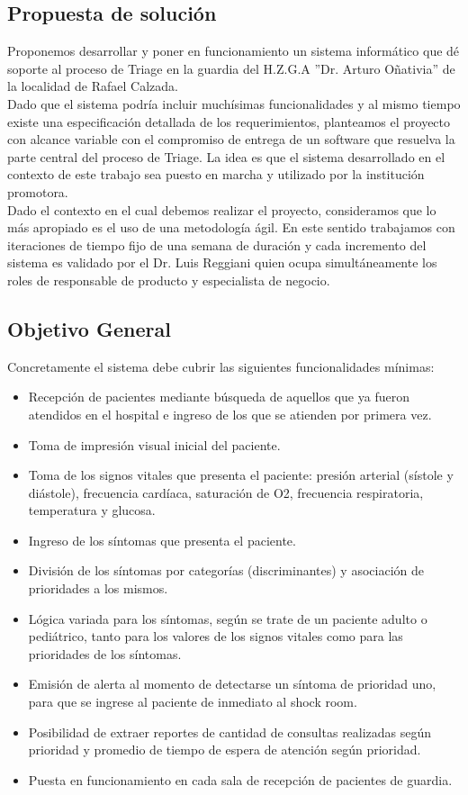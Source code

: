 \subsection{Propuesta de solución}
Proponemos desarrollar y poner en funcionamiento un sistema informático que dé soporte al proceso de Triage en la guardia del H.Z.G.A ''Dr. Arturo Oñativia'' de la localidad de Rafael Calzada.\\
Dado que el sistema podría incluir muchísimas funcionalidades y al mismo tiempo existe una especificación detallada de los requerimientos, planteamos el proyecto con alcance variable con el compromiso de entrega de un software que resuelva la parte central del proceso de Triage. La idea es que el sistema desarrollado en el contexto de este trabajo sea puesto en marcha y utilizado por la institución promotora.\\
Dado el contexto en el cual debemos realizar el proyecto, consideramos que lo más apropiado es el uso de una metodología ágil\cite{Shore}. En este sentido trabajamos con iteraciones de tiempo fijo de una semana de duración y cada incremento del sistema es validado por el Dr. Luis Reggiani quien ocupa simultáneamente los roles de responsable de producto y especialista de negocio.
\subsection{Objetivo General}
Concretamente el sistema debe cubrir las siguientes funcionalidades mínimas:
\begin{itemize}
\item Recepción de pacientes mediante búsqueda de aquellos que ya fueron atendidos en el hospital e ingreso de los que se atienden por primera vez.
\item Toma de impresión visual inicial del paciente.
\item Toma de los signos vitales que presenta el paciente: presión arterial (sístole y diástole), frecuencia cardíaca, saturación de O2, frecuencia respiratoria, temperatura y glucosa.
\item Ingreso de los síntomas que presenta el paciente.
\item División de los síntomas por categorías (discriminantes) y asociación de prioridades a los mismos.
\item Lógica variada para los síntomas, según se trate de un paciente adulto o pediátrico, tanto para los valores de los signos vitales como para las prioridades de los síntomas.
\item Emisión de alerta al momento de detectarse un síntoma de prioridad uno, para que se ingrese al paciente de inmediato al shock room.
\item Posibilidad de extraer reportes de cantidad de consultas realizadas según prioridad y promedio de tiempo de espera de atención según prioridad.
\item Puesta en funcionamiento en cada sala de recepción de pacientes de guardia.
\end{itemize}
